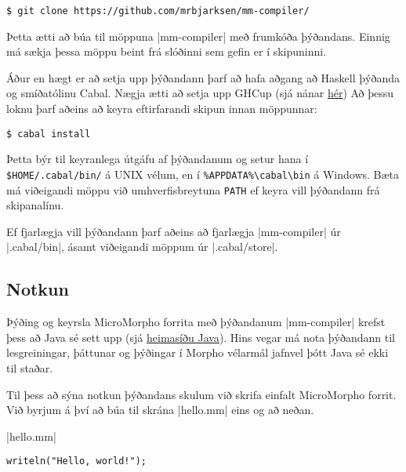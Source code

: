 \documentclass[12pt]{article}
\begin{document}
\begin{mdframed}[style=langframe]
\begin{Verbatim}
$ git clone https://github.com/mrbjarksen/mm-compiler/
\end{Verbatim}
\end{mdframed}

Þetta ætti að búa til möppuna |mm-compiler| með frumkóða þýðandans.
Einnig má sækja þessa möppu beint frá slóðinni sem gefin er í skipuninni.

Áður en hægt er að setja upp þýðandann þarf að hafa aðgang að Haskell þýðanda
og smíðatólinu Cabal. Nægja ætti að setja upp GHCup
(sjá nánar \href{https://www.haskell.org/ghcup/install/}{hér})
Að þessu loknu þarf aðeins að keyra eftirfarandi skipun innan möppunnar:

\begin{mdframed}[style=langframe]
\begin{Verbatim}
$ cabal install
\end{Verbatim}
\end{mdframed}

Þetta býr til keyranlega útgáfu af þýðandanum
og setur hana í \verb|$HOME/.cabal/bin/| á UNIX vélum,
en í \verb|%APPDATA%\cabal\bin| á Windows.
Bæta má viðeigandi möppu við umhverfisbreytuna \verb|PATH|
ef keyra vill þýðandann frá skipanalínu.

Ef fjarlægja vill þýðandann þarf aðeins að fjarlægja |mm-compiler| úr
|.cabal/bin|, ásamt viðeigandi möppum úr |.cabal/store|.

\subsection{Notkun}
Þýðing og keyrsla MicroMorpho forrita með þýðandanum |mm-compiler|
krefst þess að Java sé sett upp (sjá \href{https://www.java.com/en/}{heimasíðu Java}).
Hins vegar má nota þýðandann til lesgreiningar, þáttunar
og þýðingar í Morpho vélarmál jafnvel þótt Java sé ekki til staðar.

Til þess að sýna notkun þýðandans skulum við skrifa einfalt
MicroMorpho forrit.
Við byrjum á því að búa til skrána |hello.mm| eins og að neðan.
\medskip

\newpage

\colorbox{gray!75}{\hspace*{9pt}|hello.mm|\hspace{9pt}}\vspace{-10pt}\par%
\begin{mdframed}[style=langframe,topline=true]
\begin{Verbatim}
writeln("Hello, world!");
\end{Verbatim}
\end{mdframed}
\end{document}
